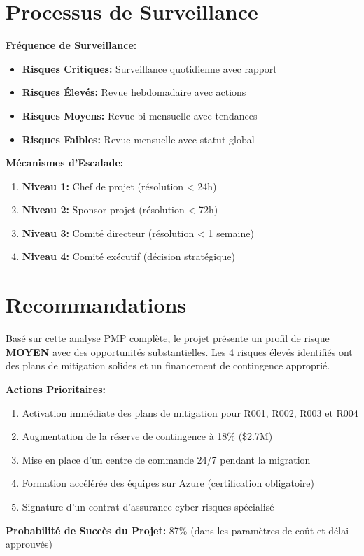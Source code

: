 \documentclass{article}
\begin{document}

\section{Processus de Surveillance}

\textbf{Fréquence de Surveillance:}
\begin{itemize}
    \item \textbf{Risques Critiques:} Surveillance quotidienne avec rapport
    \item \textbf{Risques Élevés:} Revue hebdomadaire avec actions
    \item \textbf{Risques Moyens:} Revue bi-mensuelle avec tendances
    \item \textbf{Risques Faibles:} Revue mensuelle avec statut global
\end{itemize}

\textbf{Mécanismes d'Escalade:}
\begin{enumerate}
    \item \textbf{Niveau 1:} Chef de projet (résolution < 24h)
    \item \textbf{Niveau 2:} Sponsor projet (résolution < 72h)
    \item \textbf{Niveau 3:} Comité directeur (résolution < 1 semaine)
    \item \textbf{Niveau 4:} Comité exécutif (décision stratégique)
\end{enumerate}


\section{Recommandations}

Basé sur cette analyse PMP complète, le projet présente un profil de risque \textbf{MOYEN} avec des opportunités substantielles. Les 4 risques élevés identifiés ont des plans de mitigation solides et un financement de contingence approprié.

\textbf{Actions Prioritaires:}
\begin{enumerate}
    \item Activation immédiate des plans de mitigation pour R001, R002, R003 et R004
    \item Augmentation de la réserve de contingence à 18\% (\$2.7M)
    \item Mise en place d'un centre de commande 24/7 pendant la migration
    \item Formation accélérée des équipes sur Azure (certification obligatoire)
    \item Signature d'un contrat d'assurance cyber-risques spécialisé
\end{enumerate}


\textbf{Probabilité de Succès du Projet:} 87\% (dans les paramètres de coût et délai approuvés)
\end{document}
